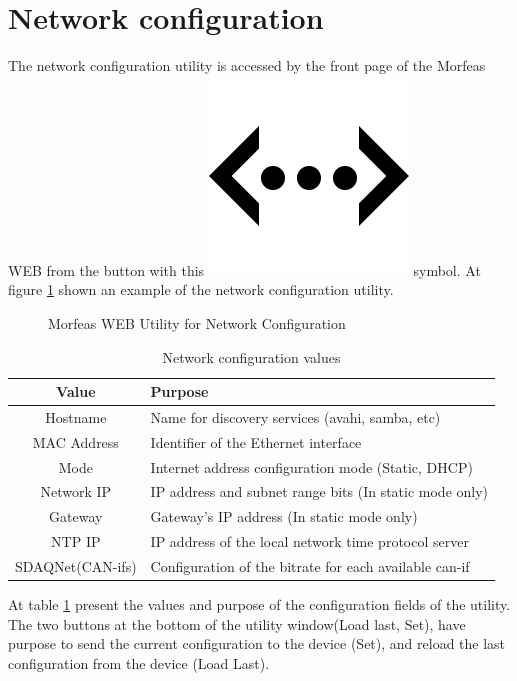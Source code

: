 \section{Network configuration}
The network configuration utility is accessed by the front page of the Morfeas WEB from the button with
this \includegraphics[height=.125in]{../art/eth.png} symbol.
At figure \ref{fig:net_conf} shown an example of the network configuration utility.

\begin{figure}[h]
\centering
	\caption{Morfeas WEB Utility for Network Configuration}
	\label{fig:net_conf}
\end{figure}

\begin{table}[h!]
	\begin{center}
		\begin{tabular}{|c|l|}
			\hline
			\textbf{Value} & \textbf{Purpose}\\
			\hline
			Hostname & Name for discovery services (avahi, samba, etc)\\
			\hline
			MAC Address & Identifier of the Ethernet interface\\
			\hline
			Mode & Internet address configuration mode (Static, DHCP)\\
			\hline
			Network IP & IP address and subnet range bits (In static mode only)\\
			Gateway & Gateway's IP address (In static mode only)\\
			\hline
			NTP IP & IP address of the local network time protocol server\\
			\hline
			SDAQNet(CAN-ifs) & Configuration of the bitrate for each available can-if\\
			\hline
		\end{tabular}
		\caption{Network configuration values}
		\label{tab:net_conf}
	\end{center}
\end{table}

At table \ref{tab:net_conf} present the values and purpose of the configuration fields of the utility.
The two buttons at the bottom of the utility window(Load last, Set),
have purpose to send the current configuration to the device (Set),
and reload the last configuration from the device (Load Last).